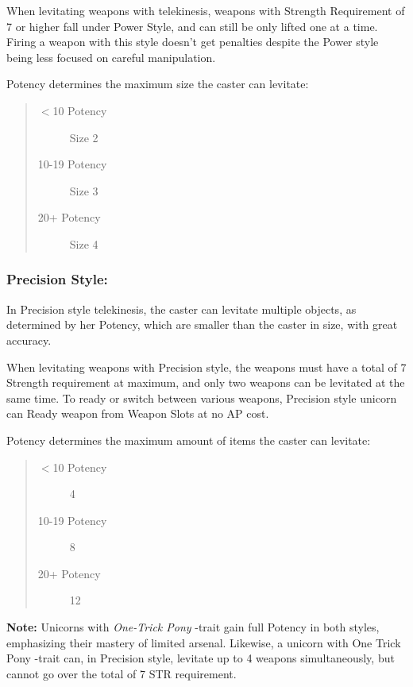 \documentclass[11pt,a4paper,twocolumn]{book}
\begin{document}
When levitating weapons with telekinesis, weapons with Strength Requirement of 7 or higher fall under Power Style, and can still be only lifted one at a time. Firing a weapon with this style doesn't get penalties despite the Power style being less focused on careful manipulation.

Potency determines the maximum size the caster can levitate:

\begin{quote}
	\begin{description}
		\item[$<$10 Potency] 	Size 2
		\item[10-19 Potency] 	Size 3
		\item[20+ Potency] 		Size 4
	\end{description}	
\end{quote}

\subsubsection*{Precision Style:}

In Precision style telekinesis, the caster can levitate multiple objects, as determined by her Potency, which are smaller than the caster in size, with great accuracy.

When levitating weapons with Precision style, the weapons must have a total of 7 Strength requirement at maximum, and only two weapons can be levitated at the same time. To ready or switch between various weapons, Precision style unicorn can Ready weapon from Weapon Slots at no AP cost. 

Potency determines the maximum amount of items the caster can levitate:

\begin{quote}
	\begin{description}
		\item[$<$10 Potency] 	4
		\item[10-19 Potency] 	8
		\item[20+ Potency] 		12
	\end{description}	
\end{quote}

\textbf{Note:} Unicorns with \textit{One-Trick Pony} -trait gain full Potency in both styles, emphasizing their mastery of limited arsenal. Likewise, a unicorn with One Trick Pony -trait can, in Precision style, levitate up to 4 weapons simultaneously, but cannot go over the total of 7 STR requirement.
\end{document}
